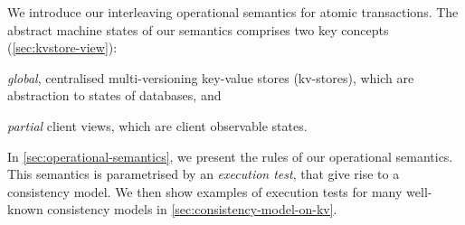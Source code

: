 We introduce our interleaving operational semantics for atomic transactions.
The abstract machine states of our semantics comprises two key concepts (\cref{sec:kvstore-view}):
\begin{enumerate*}
\item \emph{global}, centralised multi-versioning key-value stores (kv-stores), 
which are abstraction to states of databases,
and \item \emph{partial} client views, which are client observable states.
\end{enumerate*}
In \cref{sec:operational-semantics}, we present the rules of our operational semantics.
This semantics is parametrised by an \emph{execution test}, that give rise to a consistency model.
We then show examples of execution tests 
for many well-known consistency models in \cref{sec:consistency-model-on-kv}.
